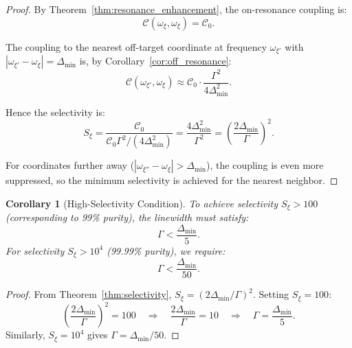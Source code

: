 \documentclass[twocolumn,10pt,a4paper]{article}
\newtheorem{corollary}[theorem]{Corollary}
\theoremstyle{remark}
\begin{document}
\begin{proof}
By Theorem~\ref{thm:resonance_enhancement}, the on-resonance coupling is:
\begin{equation}
\mathcal{C}(\omega_\xi, \omega_\xi) = \mathcal{C}_0.
\end{equation}

The coupling to the nearest off-target coordinate at frequency $\omega_{\xi'}$ with $|\omega_{\xi'} - \omega_\xi| = \Delta_{\min}$ is, by Corollary~\ref{cor:off_resonance}:
\begin{equation}
\mathcal{C}(\omega_{\xi'}, \omega_\xi) \approx \mathcal{C}_0 \cdot \frac{\Gamma^2}{4\Delta_{\min}^2}.
\end{equation}

Hence the selectivity is:
\begin{equation}
S_\xi = \frac{\mathcal{C}_0}{\mathcal{C}_0 \Gamma^2 / (4\Delta_{\min}^2)} = \frac{4\Delta_{\min}^2}{\Gamma^2} = \left( \frac{2\Delta_{\min}}{\Gamma} \right)^2.
\end{equation}

For coordinates further away ($|\omega_{\xi''} - \omega_\xi| > \Delta_{\min}$), the coupling is even more suppressed, so the minimum selectivity is achieved for the nearest neighbor.
\end{proof}

\begin{corollary}[High-Selectivity Condition]
\label{cor:high_selectivity}
To achieve selectivity $S_\xi > 100$ (corresponding to 99\% purity), the linewidth must satisfy:
\begin{equation}
\Gamma < \frac{\Delta_{\min}}{5}.
\end{equation}
For selectivity $S_\xi > 10^4$ (99.99\% purity), we require:
\begin{equation}
\Gamma < \frac{\Delta_{\min}}{50}.
\end{equation}
\end{corollary}

\begin{proof}
From Theorem~\ref{thm:selectivity}, $S_\xi = (2\Delta_{\min}/\Gamma)^2$. Setting $S_\xi = 100$:
\begin{equation}
\left( \frac{2\Delta_{\min}}{\Gamma} \right)^2 = 100 \quad \Rightarrow \quad \frac{2\Delta_{\min}}{\Gamma} = 10 \quad \Rightarrow \quad \Gamma = \frac{\Delta_{\min}}{5}.
\end{equation}
Similarly, $S_\xi = 10^4$ gives $\Gamma = \Delta_{\min}/50$.
\end{proof}
\end{document}
